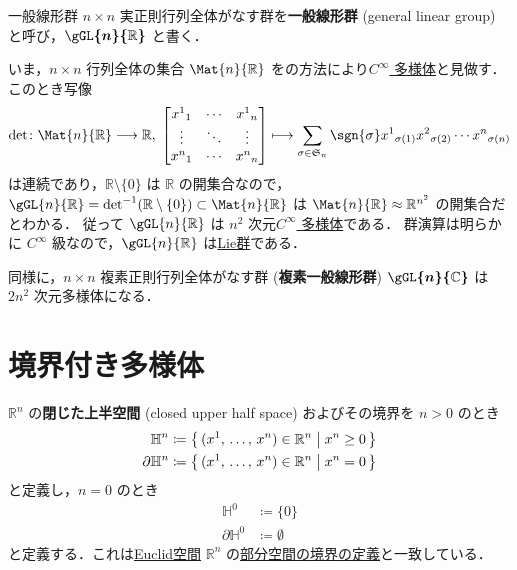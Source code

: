 \documentclass[geometry_main]{subfiles}
\begin{document}
\begin{myexample}[label=ex:GL]{一般線形群}
	$n \times n$ 実正則行列全体がなす群を\textbf{一般線形群} (general linear group) と呼び，$\bm{\gGL{n}{\mathbb{R}}}$ と書く．
	
	いま，$n \times n$ 行列全体の集合 $\Mat{n}{\mathbb{R}}$ をの方法により\hyperref[diffmani]{$C^\infty$ 多様体}と見做す．
	このとき写像
	\begin{align}
		\det \colon \Mat{n}{\mathbb{R}} \lto \mathbb{R},\; \mqty[x^1{}_{1} & \cdots &x^1{}_{n} \\ \vdots & \ddots & \vdots \\ x^n{}_{1} & \cdots & x^n{}_{n}] \lmto \sum_{\sigma \in \mathfrak{S}_n} \sgn{\sigma} x^1{}_{\sigma(1)} x^2{}_{\sigma(2)}\cdots x^n{}_{\sigma(n)}
	\end{align}
	は連続であり，$\mathbb{R} \setminus \{0\}$ は $\mathbb{R}$ の開集合なので，$\gGL{n}{\mathbb{R}} = \det^{-1}(\mathbb{R} \setminus \{0\}) \subset \Mat{n}{\mathbb{R}}$ は $\Mat{n}{\mathbb{R}} \approx \mathbb{R}^{n^2}$ の開集合だとわかる．
	従って $\gGL{n}{\mathbb{R}}$ は $n^2$ 次元\hyperref[diffmani]{$C^\infty$ 多様体}である．
	群演算は明らかに $C^\infty$ 級なので，$\gGL{n}{\mathbb{R}}$ は\hyperref[def.Liegroup]{Lie群}である．

	同様に，$n \times n$ 複素正則行列全体がなす群 (\textbf{複素一般線形群}) $\bm{\gGL{n}{\mathbb{C}}}$ は $2n^2$ 次元\cinfty 多様体になる．
\end{myexample}

\section{境界付き多様体}

$\mathbb{R}^n$ の\textbf{閉じた上半空間} (closed upper half space) およびその境界を $n > 0$ のとき
\begin{align}
	\mathbb{H}^n &\coloneqq \bigl\{\, (x^1,\, \dots ,\, x^n) \in \mathbb{R}^n \bigm| x^n \ge 0 \,\bigr\} \\
	\partial \mathbb{H}^n &\coloneqq \bigl\{\, (x^1,\, \dots ,\, x^n) \in \mathbb{R}^n \bigm| x^n = 0 \,\bigr\} 
\end{align}
と定義し，$n=0$ のとき
\begin{align}
	\mathbb{H}^0 &\coloneqq \{ 0 \} \\
	\partial \mathbb{H}^0 &\coloneqq \emptyset
\end{align}
と定義する．これは\hyperref[thm.metrictopo]{Euclid空間} $\mathbb{R}^n$ の\hyperref[def:boundary-topo]{部分空間の境界の定義}と一致している．
\end{document}
